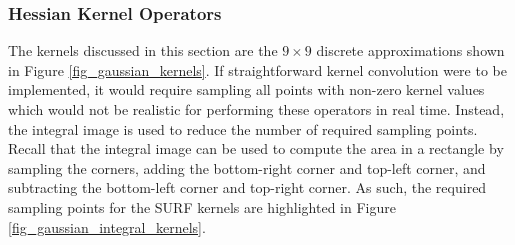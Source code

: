 \documentclass[sigconf]{acmart}
\begin{document}
\subsubsection{Hessian Kernel Operators}

The kernels discussed in this section are the $9 \times 9$ discrete approximations shown in Figure \ref{fig_gaussian_kernels}. If straightforward kernel convolution were to be implemented, it would require sampling all points with non-zero kernel values which would not be realistic for performing these operators in real time. Instead, the integral image is used to reduce the number of required sampling points. Recall that the integral image can be used to compute the area in a rectangle by sampling the corners, adding the bottom-right corner and top-left corner, and subtracting the bottom-left corner and top-right corner. As such, the required sampling points for the SURF kernels are highlighted in Figure \ref{fig_gaussian_integral_kernels}.
\end{document}
